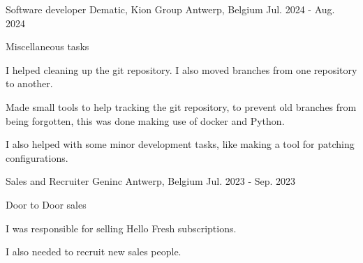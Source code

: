 

\begin{cventries}

  \cventry
    {Software developer} %
    {Dematic, Kion Group} %
    {Antwerp, Belgium} %
    {Jul. 2024 - Aug. 2024} %
    {
      \begin{cvitems} %
        \item {Miscellaneous tasks}
        \item {I helped cleaning up the git repository. I also moved branches from one repository to another.}
        \item {Made small tools to help tracking the git repository, to prevent old branches from being forgotten, this was done making use of docker and Python.}
        \item {I also helped with some minor development tasks, like making a tool for patching configurations.}
      \end{cvitems}
    }

  \cventry
    {Sales and Recruiter} %
    {Geninc} %
    {Antwerp, Belgium} %
    {Jul. 2023 - Sep. 2023} %
    {
      \begin{cvitems} %
        \item {Door to Door sales}
        \item {I was responsible for selling Hello Fresh subscriptions.}
        \item {I also needed to recruit new sales people.}
      \end{cvitems}
    }

\end{cventries}
